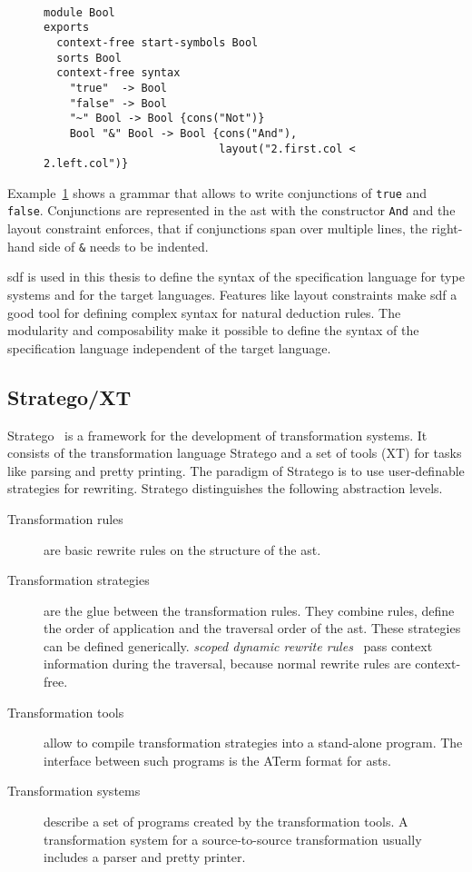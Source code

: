 \begin{figure}
\begin{example}{~}
\begin{lstlisting}[language=sdf]
module Bool
exports
  context-free start-symbols Bool
  sorts Bool
  context-free syntax
    "true"  -> Bool
    "false" -> Bool
    "~" Bool -> Bool {cons("Not")}
    Bool "&" Bool -> Bool {cons("And"),
                           layout("2.first.col < 2.left.col")}
\end{lstlisting}
\label{ex:sdf-grammar}
\end{example}
\end{figure}

Example~\ref{ex:sdf-grammar} shows a grammar that allows to write
conjunctions of \verb|true| and \verb|false|. Conjunctions are
represented in the \gls{ast} with the constructor \verb|And| and the
layout constraint enforces, that if conjunctions span over multiple
lines, the right-hand side of \verb|&| needs to be indented.

\gls{sdf} is used in this thesis to define the syntax of the
specification language for type systems and for the target
languages. Features like layout constraints make \gls{sdf} a good tool
for defining complex syntax for natural deduction rules. The
modularity and composability make it possible to define the syntax of
the specification language independent of the target language.

\subsection{Stratego/XT}
Stratego~\cite{Visser01} is a framework for the development of
transformation systems. It consists of the transformation language
Stratego and a set of tools (XT) for tasks like parsing and pretty
printing. The paradigm of Stratego is to use user-definable strategies
for rewriting. Stratego distinguishes the following abstraction
levels.

\begin{description}
\item[Transformation rules] are basic rewrite rules on the structure
  of the \gls{ast}.
\item[Transformation strategies] are the glue between the
  transformation rules. They combine rules, define the order of
  application and the traversal order of the \gls{ast}. These
  strategies can be defined generically. \textit{scoped dynamic
    rewrite rules}~\cite{Visser01scopeddynamic} pass context
  information during the traversal, because normal rewrite rules are
  context-free.
\item[Transformation tools] allow to compile transformation strategies
  into a stand-alone program. The interface between such programs is
  the ATerm format for \glspl{ast}.
\item[Transformation systems] describe a set of programs created by
  the transformation tools. A transformation system for a
  source-to-source transformation usually includes a parser and pretty
  printer.
\end{description}

